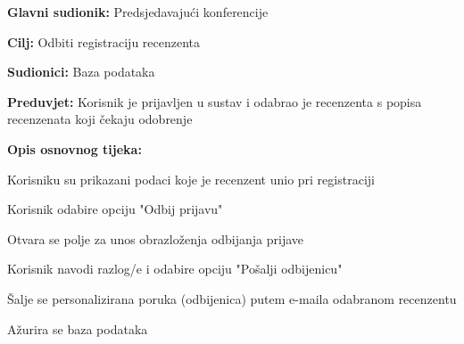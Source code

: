 					
					\noindent {}
					\begin{packed_item}
						
						\item \textbf{Glavni sudionik: } Predsjedavajući konferencije
						\item  \textbf{Cilj:} Odbiti registraciju recenzenta 
						\item  \textbf{Sudionici:} Baza podataka
						\item  \textbf{Preduvjet:} Korisnik je prijavljen u sustav i odabrao je recenzenta s popisa recenzenata koji čekaju odobrenje
						\item  \textbf{Opis osnovnog tijeka:}
						
						\item[] \begin{packed_enum}
							
							
							\item Korisniku su prikazani podaci koje je recenzent unio pri registraciji
							\item Korisnik odabire opciju "Odbij prijavu"
							\item Otvara se polje za unos obrazloženja odbijanja prijave
							\item Korisnik navodi razlog/e i odabire opciju "Pošalji odbijenicu"
							\item Šalje se personalizirana poruka (odbijenica) putem e-maila odabranom recenzentu
							\item Ažurira se baza podataka
							
							
						\end{packed_enum}
						
					\end{packed_item}
					
